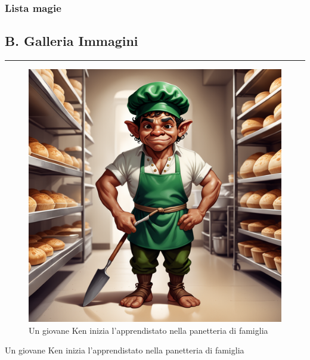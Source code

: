\subsubsection{Lista magie}\label{lista-magie}

\subsection{B. Galleria Immagini}\label{b.-galleria-immagini}

\begin{center}\rule{0.5\linewidth}{0.5pt}\end{center}

\begin{figure}
\centering
\includegraphics{create-a-digital-illustration-of-ken-nataro-a-mulatto-skinned-halfling-with-a-sturdy-physique-ken-.png}
\caption{Un giovane Ken inizia l'apprendistato nella panetteria di
famiglia}
\end{figure}

Un giovane Ken inizia l'apprendistato nella panetteria di famiglia

